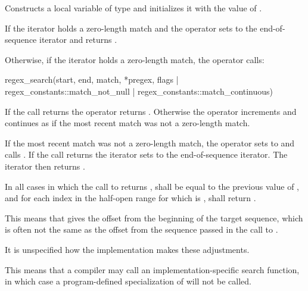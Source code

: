\begin{itemdescr}
\pnum
\effects
Constructs a local variable  of type  and
initializes it with the value of .

\pnum
If the iterator holds a zero-length match and  the operator
sets  to the end-of-sequence iterator and returns .

\pnum
{}%
%
Otherwise, if the iterator holds a zero-length match, the operator calls:
\begin{codeblock}
regex_search(start, end, match, *pregex,
             flags | regex_constants::match_not_null | regex_constants::match_continuous)
\end{codeblock}
If the call returns  the operator
returns . Otherwise the operator increments  and continues as if
the most recent match was not a zero-length match.

\pnum
{}%
If the most recent match was not a zero-length match, the operator sets
 to  and
calls . If the call returns
 the iterator sets  to the end-of-sequence iterator. The
iterator then returns .

\pnum
In all cases in which the call to  returns ,
 shall be equal to the previous value of
, and for each index  in the half-open range
\tcode{[0, match.size())} for which  is ,
shall return .

\pnum
\begin{note}
This means that  gives the
offset from the beginning of the target sequence, which is often not
the same as the offset from the sequence passed in the call
to .
\end{note}

\pnum
It is unspecified how the implementation makes these adjustments.

\pnum
\begin{note}
This means that a compiler may call an
implementation-specific search function, in which case a program-defined
specialization of  will not be
called.
\end{note}
\end{itemdescr}

